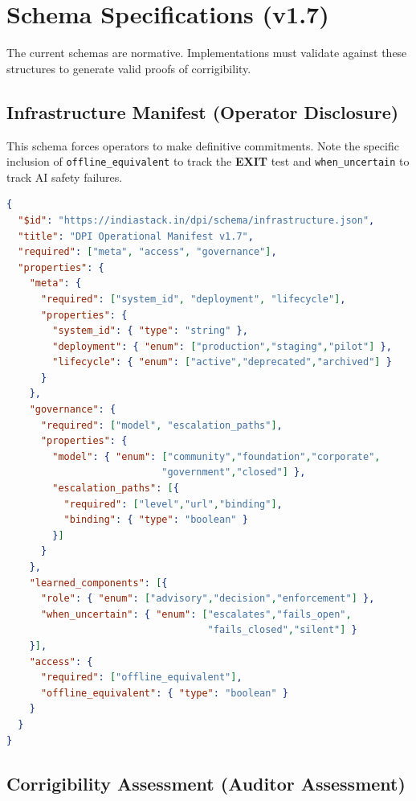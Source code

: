 \section{Schema Specifications (v1.7)}
\label{appendix:schema}

The current schemas are normative. Implementations must validate against these structures to generate valid proofs of corrigibility.

\subsection{Infrastructure Manifest (Operator Disclosure)}

This schema forces operators to make definitive commitments. Note the specific inclusion of \texttt{offline\_equivalent} to track the \textbf{EXIT} test and \texttt{when\_uncertain} to track AI safety failures.

\begin{lstlisting}[language=json,caption={Operator Disclosure Schema (condensed)}]
{
  "$id": "https://indiastack.in/dpi/schema/infrastructure.json",
  "title": "DPI Operational Manifest v1.7",
  "required": ["meta", "access", "governance"],
  "properties": {
    "meta": {
      "required": ["system_id", "deployment", "lifecycle"],
      "properties": {
        "system_id": { "type": "string" },
        "deployment": { "enum": ["production","staging","pilot"] },
        "lifecycle": { "enum": ["active","deprecated","archived"] }
      }
    },
    "governance": {
      "required": ["model", "escalation_paths"],
      "properties": {
        "model": { "enum": ["community","foundation","corporate",
                           "government","closed"] },
        "escalation_paths": [{
          "required": ["level","url","binding"],
          "binding": { "type": "boolean" }
        }]
      }
    },
    "learned_components": [{
      "role": { "enum": ["advisory","decision","enforcement"] },
      "when_uncertain": { "enum": ["escalates","fails_open",
                                   "fails_closed","silent"] }
    }],
    "access": {
      "required": ["offline_equivalent"],
      "offline_equivalent": { "type": "boolean" }
    }
  }
}
\end{lstlisting}

\subsection{Corrigibility Assessment (Auditor Assessment)}

